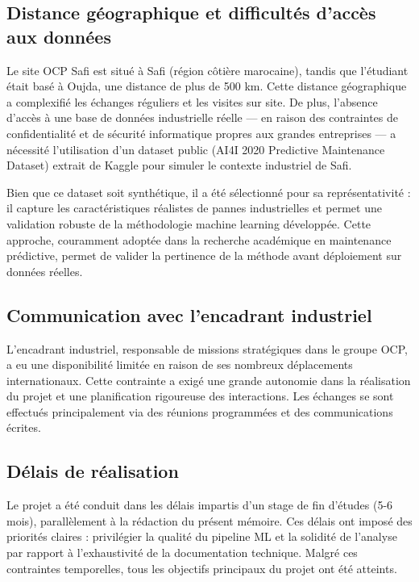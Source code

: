 \documentclass[a4paper,12pt]{report}
\begin{document}
\subsection{Distance géographique et difficultés d'accès aux données}

Le site OCP Safi est situé à Safi (région côtière marocaine), tandis que l'étudiant était basé à Oujda, une distance de plus de 500 km. Cette distance géographique a complexifié les échanges réguliers et les visites sur site. De plus, l'absence d'accès à une base de données industrielle réelle — en raison des contraintes de confidentialité et de sécurité informatique propres aux grandes entreprises — a nécessité l'utilisation d'un dataset public (AI4I 2020 Predictive Maintenance Dataset) extrait de Kaggle pour simuler le contexte industriel de Safi.

Bien que ce dataset soit synthétique, il a été sélectionné pour sa représentativité : il capture les caractéristiques réalistes de pannes industrielles et permet une validation robuste de la méthodologie machine learning développée. Cette approche, couramment adoptée dans la recherche académique en maintenance prédictive, permet de valider la pertinence de la méthode avant déploiement sur données réelles.

\subsection{Communication avec l'encadrant industriel}

L'encadrant industriel, responsable de missions stratégiques dans le groupe OCP, a eu une disponibilité limitée en raison de ses nombreux déplacements internationaux. Cette contrainte a exigé une grande autonomie dans la réalisation du projet et une planification rigoureuse des interactions. Les échanges se sont effectués principalement via des réunions programmées et des communications écrites.

\subsection{Délais de réalisation}

Le projet a été conduit dans les délais impartis d'un stage de fin d'études (5-6 mois), parallèlement à la rédaction du présent mémoire. Ces délais ont imposé des priorités claires : privilégier la qualité du pipeline ML et la solidité de l'analyse par rapport à l'exhaustivité de la documentation technique. Malgré ces contraintes temporelles, tous les objectifs principaux du projet ont été atteints.
\end{document}
